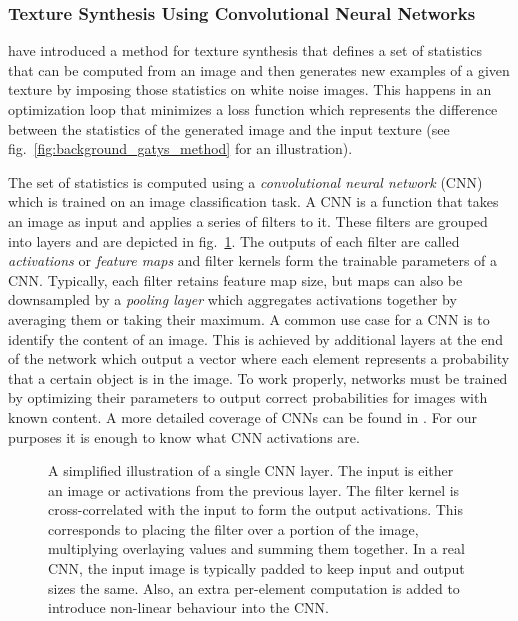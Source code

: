 \subsubsection{Texture Synthesis Using Convolutional Neural Networks}
\label{section:background-texture_synthesis-statistics_based-synthesis_using_cnns}

\citet{Gatys2015} have introduced a method for texture synthesis that defines a set of statistics that can be computed from an image and then generates new examples of a given texture by imposing those statistics on white noise images. This happens in an optimization loop that minimizes a loss function which represents the difference between the statistics of the generated image and the input texture (see fig.~\ref{fig:background_gatys_method} for an illustration).

The set of statistics is computed using a \textit{convolutional neural network} (CNN) which is trained on an image classification task. A CNN is a function that takes an image as input and applies a series of filters to it. These filters are grouped into layers and are depicted in fig.~\ref{fig:background_cnn}. The outputs of each filter are called \textit{activations} or \textit{feature maps} and filter kernels form the trainable parameters of a CNN. Typically, each filter retains feature map size, but maps can also be downsampled by a \textit{pooling layer} which aggregates activations together by averaging them or taking their maximum. A common use case for a CNN is to identify the content of an image. This is achieved by additional layers at the end of the network which output a vector where each element represents a probability that a certain object is in the image. To work properly, networks must be trained by optimizing their parameters to output correct probabilities for images with known content. A more detailed coverage of CNNs can be found in \citet{Goodfellow2016}. For our purposes it is enough to know what CNN activations are.

\begin{figure}
    \centering
    \def\svgwidth{0.6\textwidth}
    
    \caption{A simplified illustration of a single CNN layer. The input is either an image or activations from the previous layer. The filter kernel is cross-correlated with the input to form the output activations. This corresponds to placing the filter over a portion of the image, multiplying overlaying values and summing them together. In a real CNN, the input image is typically padded to keep input and output sizes the same. Also, an extra per-element computation is added to introduce non-linear behaviour into the CNN.}
    \label{fig:background_cnn}
\end{figure}

